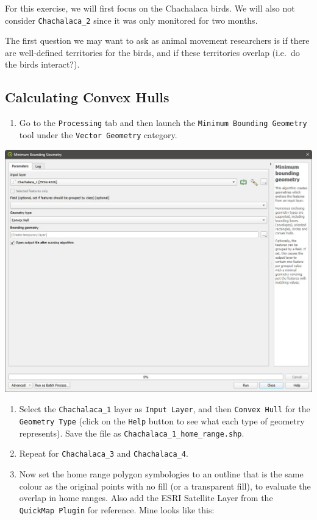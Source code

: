 \documentclass[
  letterpaper,
  DIV=11,
  numbers=noendperiod]{scrreprt}
\providecommand{\tightlist}{%
  \setlength{\itemsep}{0pt}\setlength{\parskip}{0pt}}\usepackage{longtable,booktabs,array}
\begin{document}
For this exercise, we will first focus on the Chachalaca birds. We will
also not consider \texttt{Chachalaca\_2} since it was only monitored for
two months.

The first question we may want to ask as animal movement researchers is
if there are well-defined territories for the birds, and if these
territories overlap (i.e.~do the birds interact?).

\subsection{Calculating Convex Hulls}\label{calculating-convex-hulls}

\begin{enumerate}
\def\labelenumi{(\arabic{enumi})}
\setcounter{enumi}{355}
\tightlist
\item
  Go to the \texttt{Processing} tab and then launch the
  \texttt{Minimum\ Bounding\ Geometry} tool under the
  \texttt{Vector\ Geometry} category.
\end{enumerate}

\includegraphics{images/lab_14/lab14_fig1_convex_hull.jpg}

\begin{enumerate}
\def\labelenumi{(\arabic{enumi})}
\setcounter{enumi}{356}
\item
  Select the \texttt{Chachalaca\_1} layer as \texttt{Input\ Layer}, and
  then \texttt{Convex\ Hull} for the \texttt{Geometry\ Type} (click on
  the \texttt{Help} button to see what each type of geometry
  represents). Save the file as \texttt{Chachalaca\_1\_home\_range.shp}.
\item
  Repeat for \texttt{Chachalaca\_3} and \texttt{Chachalaca\_4}.
\item
  Now set the home range polygon symbologies to an outline that is the
  same colour as the original points with no fill (or a transparent
  fill), to evaluate the overlap in home ranges. Also add the ESRI
  Satellite Layer from the \texttt{QuickMap\ Plugin} for reference. Mine
  looks like this:
\end{enumerate}
\end{document}

